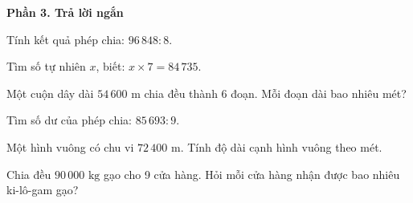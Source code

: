 \textbf{Phần 3. Trả lời ngắn}

\begin{ex} %
Tính kết quả phép chia: $96\,848 : 8$.
\end{ex}

\begin{ex} %
Tìm số tự nhiên $x$, biết: $x \times 7 = 84\,735$.
\end{ex}

\begin{ex} %
Một cuộn dây dài $54\,600\text{ m}$ chia đều thành 6 đoạn. Mỗi đoạn dài bao nhiêu mét?
\end{ex}

\begin{ex} %
Tìm số dư của phép chia: $85\,693 : 9$.
\end{ex}

\begin{ex} %
Một hình vuông có chu vi $72\,400\text{ m}$. Tính độ dài cạnh hình vuông theo mét.
\end{ex}

\begin{ex} %
Chia đều $90\,000\text{ kg}$ gạo cho 9 cửa hàng. Hỏi mỗi cửa hàng nhận được bao nhiêu ki-lô-gam gạo?
\end{ex}
